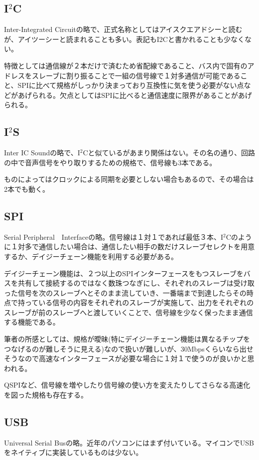 \documentclass[a4paper,titlepage,here]{ujarticle}
\begin{document}
\subsection{I$^2$C}
Inter-Integrated Circuitの略で、正式名称としてはアイスクエアドシーと読むが、アイツーシーと読まれることも多い。表記もI2Cと書かれることも少なくない。

特徴としては通信線が２本だけで済むため省配線であること、バス内で固有のアドレスをスレーブに割り振ることで一組の信号線で１対多通信が可能であること、SPIに比べて規格がしっかり決まっており互換性に気を使う必要がない点などがあげられる。欠点としてはSPIに比べると通信速度に限界があることがあげられる。
\subsection{I$^2$S}
Inter IC Soundの略で、I$^2$Cと似ているがあまり関係はない。その名の通り、回路の中で音声信号をやり取りするための規格で、信号線も3本である。

ものによってはクロックによる同期を必要としない場合もあるので、その場合は2本でも動く。
\subsection{SPI}
Serial Peripheral　Interfaceの略。信号線は１対１であれば最低３本、I$^2$Cのように１対多で通信したい場合は、通信したい相手の数だけスレーブセレクトを用意するか、デイジーチェーン機能を利用する必要がある。

デイジーチェーン機能は、２つ以上のSPIインターフェースをもつスレーブをバスを共有して接続するのではなく数珠つなぎにし、それぞれのスレーブは受け取った信号を次のスレーブへとそのまま流していき、一番端まで到達したらその時点で持っている信号の内容をそれぞれのスレーブが実施して、出力をそれぞれのスレーブが前のスレーブへと渡していくことで、信号線を少なく保ったまま通信する機能である。

筆者の所感としては、規格が曖昧(特にデイジーチェーン機能は異なるチップをつなげるのが難しそうに見える)なので扱いが難しいが、30Mbpsくらいなら出せそうなので高速なインターフェースが必要な場合に１対１で使うのが良いかと思われる。

QSPIなど、信号線を増やしたり信号線の使い方を変えたりしてさらなる高速化を図った規格も存在する。
\subsection{USB}
Universal Serial Busの略。近年のパソコンにはまず付いている。マイコンでUSBをネイティブに実装しているものは少ない。
\end{document}

